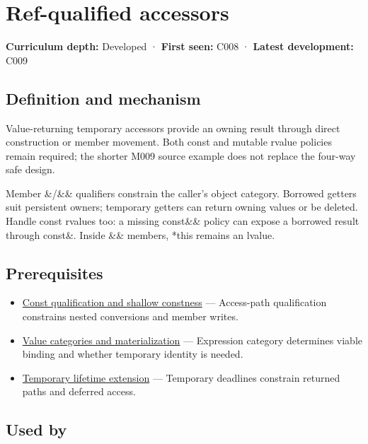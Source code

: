 \hypertarget{appendix-d42039b1d6f7}{}
\section{Ref-qualified accessors}\label{appendix-d42039b1d6f7-ref-qualified-accessors}

\textbf{Curriculum depth:} Developed · \textbf{First seen:} C008 · \textbf{Latest development:} C009

\subsection{Definition and mechanism}\label{appendix-d42039b1d6f7-definition-and-mechanism}

Value-returning temporary accessors provide an owning result through direct construction or member movement. Both const and mutable rvalue policies remain required; the shorter M009 source example does not replace the four-way safe design.

Member \&/\&\& qualifiers constrain the caller's object category. Borrowed getters suit persistent owners; temporary getters can return owning values or be deleted. Handle const rvalues too: a missing const\&\& policy can expose a borrowed result through const\&. Inside \&\& members, *this remains an lvalue.

\subsection{Prerequisites}\label{appendix-d42039b1d6f7-prerequisites}

\begin{itemize}
\tightlist
\item
  \hyperref[appendix-c25d60fed375]{Const qualification and shallow constness} --- Access-path qualification constrains nested conversions and member writes.
\item
  \hyperref[appendix-1121b30eaeb0]{Value categories and materialization} --- Expression category determines viable binding and whether temporary identity is needed.
\item
  \hyperref[appendix-a978b29bbbb0]{Temporary lifetime extension} --- Temporary deadlines constrain returned paths and deferred access.
\end{itemize}

\subsection{Used by}\label{appendix-d42039b1d6f7-used-by}

